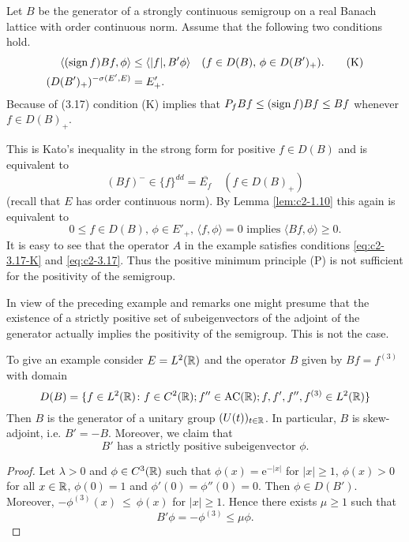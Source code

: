 \begin{remark}\label{rem:c2-3.16}
Let $B$ be the generator of a strongly continuous semigroup on a real Banach lattice with order continuous norm. Assume that the following two conditions hold.
\begin{align}
\langle(\operatorname{sign}  f)Bf,\phi\rangle &\leq \langle|f|,B'\phi\rangle \quad (f \in D(B), \, \phi \in D(B')_{+}). \label{eq:c2-3.17-K} \tag{K}\\
(D(B')_{+})^{-\sigma(E',E)} &= E'_{+}. \label{eq:c2-3.17}
\end{align}
Because of (3.17) condition (K) implies that $P_{f}Bf \leq (\operatorname{sign}  f)Bf \leq Bf$
whenever $f \in D(B)_{+}$.

This is Kato's inequality in the strong form for positive $f \in D(B)$ and is equivalent to 
\[
(Bf)^{-} \in \{f\}^{dd} = \overline{E_f} \quad (f \in D(B)_{+})
\]
(recall that $E$ has order continuous norm). By Lemma 
\ref{lem:c2-1.10}  this again is equivalent to
\begin{equation}\label{eq:c2-P2} \tag{P}
0 \leq f \in D(B), \, \phi \in E'_{+}, \, \langle f,\phi \rangle = 0 \text{ implies } \langle Bf,\phi \rangle \geq 0.
\end{equation}
It is easy to see that the operator $A$ in the example satisfies conditions \eqref{eq:c2-3.17-K}  and \eqref{eq:c2-3.17}. Thus the positive minimum principle (P) is not sufficient for the positivity of the semigroup.
\end{remark}
In view of the preceding example and remarks one might presume that the existence of a strictly positive set of subeigenvectors of the adjoint of the generator actually implies the positivity of the semigroup. 
This is not the case.

To give an example consider $E = L^{2}(\mathbb{R})$ and the operator $B$ given by 
$Bf = f^{(3)}$ with domain
\[
D(B) = \{f \in L^{2}(\mathbb{R}) \colon f \in C^{2}(\mathbb{R}); f'' \in \text{AC}(\mathbb{R}) ; f,f',f'',f^{(3)} \in L^{2}(\mathbb{R})\}
\]
Then $B$ is the generator of a unitary group $(U(t))_{t \in \mathbb{R}}$. 
In particular, $B$ is skew-adjoint, i.e. $B' = -B$.
Moreover, we claim that
\begin{equation}\label{eq:c2-3.18}
B' \text{ has a strictly positive subeigenvector } \phi.
\end{equation}
\begin{proof}
Let $\lambda > 0$ and $\phi \in C^{3}(\mathbb{R})$ such that $\phi(x) = \mathrm{e}^{-|x|}$ for
$|x| \geq 1$, $\phi(x) > 0$ for all $x \in \mathbb{R}$, $\phi(0) = 1$ and $\phi'(0) = \phi''(0) = 0$.
Then $\phi \in D(B')$. 
Moreover, $-\phi^{(3)}(x)~\leq~\phi(x)$ for $|x| \geq 1$. 
Hence there exists $\mu \geq 1$ such that
%
\[
	B'\phi = -\phi^{(3)} \leq \mu\phi .
\]
%
\phantom{x}
\end{proof}

